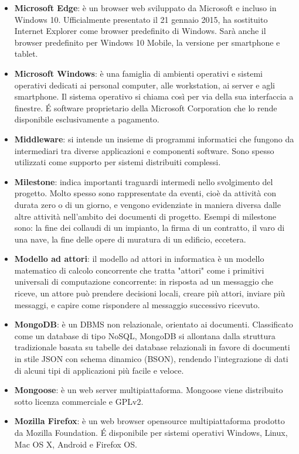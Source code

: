 \begin{itemize}
	\item
	\textbf{Microsoft Edge}: è un browser web sviluppato da Microsoft e incluso in Windows 10. Ufficialmente presentato il 21 gennaio 2015, ha sostituito Internet Explorer come browser predefinito di Windows. Sarà anche il browser predefinito per Windows 10 Mobile, la versione per smartphone e tablet.
	\item
	\textbf{Microsoft Windows}: è una famiglia di ambienti operativi e sistemi operativi dedicati ai personal computer, alle workstation, ai server e agli smartphone. Il sistema operativo si chiama così per via della sua interfaccia a finestre.
	\'E software proprietario della Microsoft Corporation che lo rende disponibile esclusivamente a pagamento.
	\item
	\textbf{Middleware}: si intende un insieme di programmi informatici che fungono da intermediari tra diverse applicazioni e componenti software. Sono spesso utilizzati come supporto per sistemi distribuiti complessi.
	\item
	\textbf{Milestone}: indica importanti traguardi intermedi nello svolgimento del progetto. Molto spesso sono rappresentate da eventi, cioè da attività con durata zero o di un giorno, e vengono evidenziate in maniera diversa dalle altre attività nell'ambito dei documenti di progetto. Esempi di milestone sono: la fine dei collaudi di un impianto, la firma di un contratto, il varo di una nave, la fine delle opere di muratura di un edificio, eccetera.
	\item
	\textbf{Modello ad attori}: il modello ad attori in informatica è un modello matematico di calcolo concorrente che tratta "attori" come i primitivi universali di computazione concorrente: in risposta ad un messaggio che riceve, un attore può prendere decisioni locali, creare più attori, inviare più messaggi, e capire come rispondere al messaggio successivo ricevuto. 
	\item
	\textbf{MongoDB}: è un DBMS non relazionale, orientato ai documenti. Classificato come un database di tipo NoSQL, MongoDB si allontana dalla struttura tradizionale basata su tabelle dei database relazionali in favore di documenti in stile JSON con schema dinamico (BSON), rendendo l'integrazione di dati di alcuni tipi di applicazioni più facile e veloce. 
	\item
	\textbf{Mongoose}: è un web server multipiattaforma. Mongoose viene distribuito sotto licenza commerciale e GPLv2. 
	\item 
	\textbf{Mozilla Firefox}: è un web browser opensource multipiattaforma prodotto da Mozilla Foundation. \'E disponibile per sistemi operativi Windows, Linux, Mac OS X, Android e Firefox OS. 
\end{itemize}
